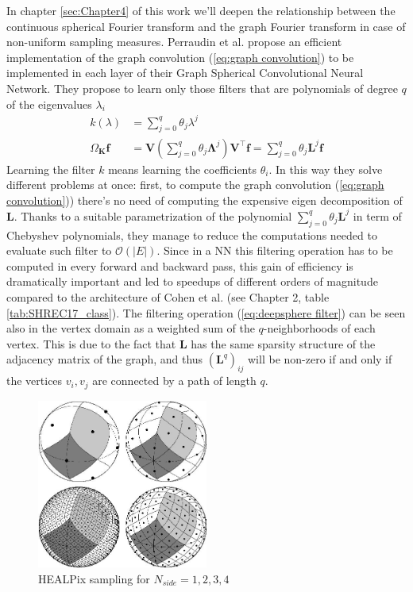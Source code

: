 In chapter \ref{sec:Chapter4} of this work we'll deepen the relationship between the continuous spherical Fourier transform and the graph Fourier transform in case of non-uniform sampling measures. Perraudin et al. propose an efficient implementation of the graph convolution (\ref{eq:graph convolution}) to be implemented in each layer of their Graph Spherical Convolutional Neural Network. They propose to learn only those filters that are polynomials of degree $q$ of the eigenvalues $\lambda_i$
\begin{equation}\label{eq:deepsphere filter}
\begin{aligned}
k(\lambda) &= \sum_{j=0}^{q} \theta_{j} \lambda^{j}\\ 
\Omega_\mathbf K \mathbf f &= \boldsymbol{V}\left(\sum_{j=0}^{q} \theta_{j} \boldsymbol{\Lambda}^{j}\right) \boldsymbol{V}^{\top} \boldsymbol{f}=\sum_{j=0}^{q} \theta_{j} \boldsymbol{L}^{j} \boldsymbol{f}
\end{aligned}
\end{equation}
Learning the filter $k$ means learning the coefficients $\theta_i$. In this way they solve different problems at once: first, to compute the graph convolution (\ref{eq:graph convolution})) there's no need of computing the expensive eigen decomposition of $\mathbf L$. Thanks to a suitable parametrization of the polynomial $\sum_{j=0}^{q} \theta_{j} \boldsymbol{L}^{j}$ in term of Chebyshev polynomials, they manage to reduce the computations needed to evaluate such filter to $\mathcal O(|E|)$. Since in a NN this filtering operation has to be computed in every forward and backward pass, this gain of efficiency is dramatically important and led to speedups of different orders of magnitude compared to the architecture of Cohen et al. (see Chapter 2, table \ref{tab:SHREC17_class}). The filtering operation (\ref{eq:deepsphere filter}) can be seen also in the vertex domain as a weighted sum of the $q$-neighborhoods of each vertex. This is due to the fact that $\mathbf L $ has the same sparsity structure of the adjacency matrix of the graph, and thus $(\mathbf L^q)_{ij}$ will be non-zero if and only if the vertices $v_i, v_j$ are connected by a path of length $q$. 

\begin{figure}
	\centering
	\includegraphics[width=0.5\textwidth]{figs/chapter1/healpix.jpg}
	\caption{\label{fig:healpix sampling}HEALPix sampling for $N_{side}=1,2,3,4$ \cite{HEALPix}}
\end{figure}

